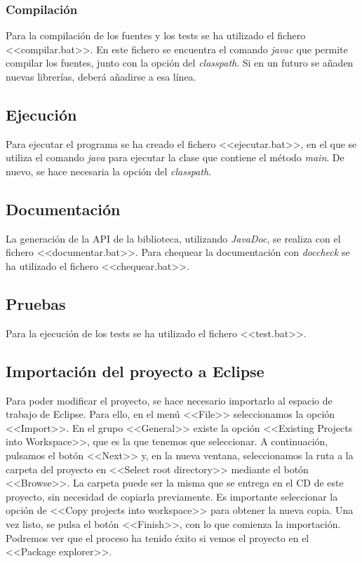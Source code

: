 \subsubsection{Compilación}
Para la compilación de los fuentes y los tests se ha utilizado el fichero <<compilar.bat>>. En este fichero se encuentra el comando \textit{javac} que permite compilar los fuentes, junto con la opción del \textit{classpath}. Si en un futuro se añaden nuevas librerías, deberá añadirse a esa línea.

\subsection{Ejecución}
Para ejecutar el programa se ha creado el fichero <<ejecutar.bat>>, en el que se utiliza el comando \textit{java} para ejecutar la clase que contiene el método \textit{main}. De nuevo, se hace necesaria la opción del \textit{classpath}.

\subsection{Documentación}
La generación de la API de la biblioteca, utilizando \textit{JavaDoc}, se realiza con el fichero <<documentar.bat>>. Para chequear la documentación con \textit{doccheck} se ha utilizado el fichero <<chequear.bat>>.

\subsection{Pruebas}
Para la ejecución de los tests se ha utilizado el fichero <<test.bat>>.

\subsection{Importación del proyecto a Eclipse}
Para poder modificar el proyecto, se hace necesario importarlo al espacio de trabajo de Eclipse. Para ello, en el menú <<File>> seleccionamos la opción <<Import>>. En el grupo <<General>> existe la opción <<Existing Projects into Workspace>>, que es la que tenemos que seleccionar. A continuación, pulsamos el botón <<Next>> y, en la nueva ventana, seleccionamos la ruta a la carpeta del proyecto en <<Select root directory>> mediante el botón <<Browse>>. La carpeta puede ser la misma que se entrega en el CD de este proyecto, sin necesidad de copiarla previamente. Es importante seleccionar la opción de <<Copy projects into workspace>> para obtener la nueva copia. Una vez listo, se pulsa el botón <<Finish>>, con lo que comienza la importación. Podremos ver que el proceso ha tenido éxito si vemos el proyecto en el <<Package explorer>>.



